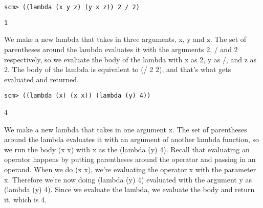 \begin{blocksection}
\begin{lstlisting}
scm> ((lambda (x y z) (y x z)) 2 / 2)
\end{lstlisting}
\begin{solution}[0.25in]
\begin{lstlisting}
1
\end{lstlisting}
We make a new lambda that takes in three arguments, x, y and z. The set of parentheses around the lambda evaluates it with the arguments 2, / and 2 respectively, so we evaluate the body of the lambda with x as 2, y as /, and z as 2. The body of the lambda is equivalent to (/ 2 2), and that’s what gets evaluated and returned.
\end{solution}

\begin{lstlisting}
scm> ((lambda (x) (x x)) (lambda (y) 4))
\end{lstlisting}
\begin{solution}[0.25in]
4

We make a new lambda that takes in one argument x. The set of parentheses around the lambda evaluates it with an argument of another lambda function, so we run the body (x x) with x as the (lambda (y) 4). Recall that evaluating an operator happens by putting parentheses around the operator and passing in an operand. When we do (x x), we’re evaluating the operator x with the parameter x. Therefore we’re now doing (lambda (y) 4) evaluated with the argument y as (lambda (y) 4). Since we evaluate the lambda, we evaluate the body and return it, which is 4. 
\end{solution}
\end{blocksection}

